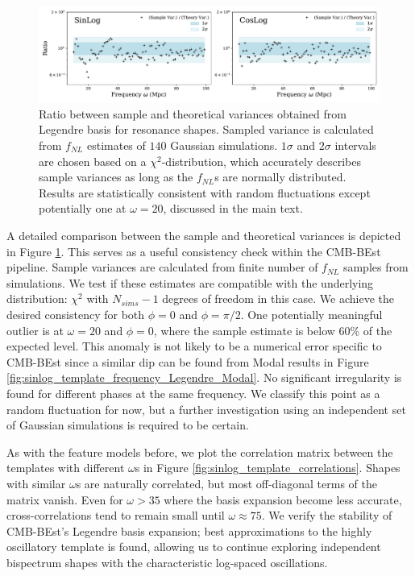 \begin{figure}[htbp!] 
	\centering    
	\includegraphics[width=\textwidth]{sinlog_template_frequency_variances_Legendre.pdf}
	\caption{Ratio between sample and theoretical variances obtained from Legendre basis for resonance shapes. Sampled variance is calculated from $f_{NL}$ estimates of $140$ Gaussian simulations. $1\sigma$ and $2\sigma$ intervals are chosen based on a $\chi^2$-distribution, which accurately describes sample variances as long as the $f_{NL}$s are normally distributed. Results are statistically consistent with random fluctuations except potentially one at $\omega=20$, discussed in the main text.}
	\label{fig:sinlog_template_frequency_variances_Legendre}
\end{figure}

A detailed comparison between the sample and theoretical variances is depicted in Figure \ref{fig:sinlog_template_frequency_variances_Legendre}. This serves as a useful consistency check within the CMB-BEst pipeline. Sample variances are calculated from finite number of $f_{NL}$ samples from simulations. We test if these estimates are compatible with the underlying distribution: $\chi^2$ with $N_{sims}-1$ degrees of freedom in this case. We achieve the desired consistency for both $\phi=0$ and $\phi=\pi/2$. One potentially meaningful outlier is at $\omega=20$ and $\phi=0$, where the sample estimate is below 60\% of the expected level. This anomaly is not likely to be a numerical error specific to CMB-BEst since a similar dip can be found from Modal results in Figure \ref{fig:sinlog_template_frequency_Legendre_Modal}. No significant irregularity is found for different phases at the same frequency. We classify this point as a random fluctuation for now, but a further investigation using an independent set of Gaussian simulations is required to be certain.

As with the feature models before, we plot the correlation matrix between the templates with different $\omega$s in Figure \ref{fig:sinlog_template_correlations}. Shapes with similar $\omega$s are naturally correlated, but most off-diagonal terms of the matrix vanish. Even for $\omega > 35$ where the basis expansion become less accurate, cross-correlations tend to remain small until $\omega \approx 75$. We verify the stability of CMB-BEst's Legendre basis expansion; best approximations to the highly oscillatory template is found, allowing us to continue exploring independent bispectrum shapes with the characteristic log-spaced oscillations.


